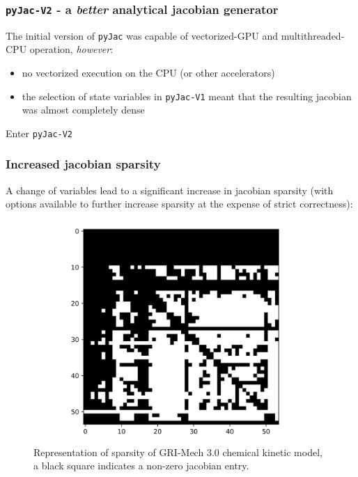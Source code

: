 \documentclass{beamer}
\begin{document}
\begin{frame}
 \frametitle{\texttt{pyJac-V2} - a \textit{better} analytical jacobian generator}
 The initial version of \texttt{pyJac} was capable of vectorized-GPU and multithreaded-CPU operation, \textit{however}:
 \begin{itemize}
  \item no vectorized execution on the CPU (or other accelerators)
  \item the selection of state variables in \texttt{pyJac-V1} meant that the resulting jacobian was almost completely dense
 \end{itemize}
 \textrightarrow Enter \texttt{pyJac-V2}
\end{frame}

\begin{frame}
\frametitle{Increased jacobian sparsity}
A change of variables lead to a significant increase in jacobian sparsity (with options available to further increase sparsity at the expense of strict correctness):
\begin{figure}
 \includegraphics[height=0.5\textheight]{ch4_sparsity_exact.png}
 \caption{Representation of sparsity of GRI-Mech 3.0 chemical kinetic model, a black square indicates a non-zero jacobian entry.}
\end{figure}
\end{frame}
\end{document}
